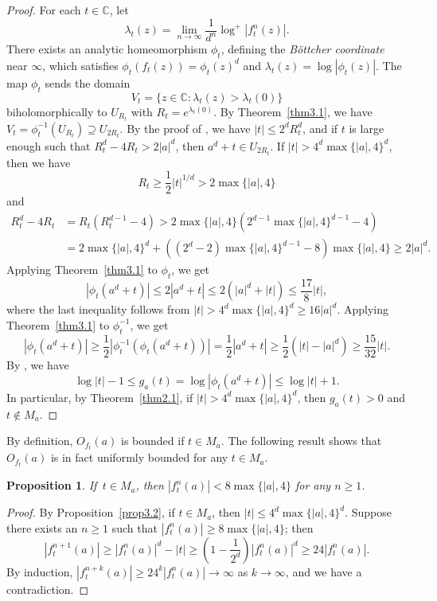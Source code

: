 \documentclass[11pt]{amsart}
\numberwithin{equation}{section}
\theoremstyle{plain}
\newtheorem{prop}[thm]{Proposition}
\theoremstyle{definition}
\theoremstyle{remark}
\newcommand{\C}{\mathbb C}
\begin{document}
\begin{proof}
For each $t\in\C$, let
\[
\lambda_{t}(z)=\lim_{n\to\infty}\frac{1}{d^{n}}\log^{+}|f_{t}^{n}(z)|.
\]
There exists an analytic homeomorphism $\phi_{t}$, defining the \textit{B\"ottcher coordinate} near $\infty$, which satisfies $\phi_{t}(f_{t}(z))=\phi_{t}(z)^{d}$ and $\lambda_{t}(z)=\log|\phi_{t}(z)|$. The map $\phi_{t}$ sends the domain
\[
V_{t}=\{z\in\C:\lambda_{t}(z)>\lambda_{t}(0)\}
\]
biholomorphically to $U_{R_{t}}$ with $R_{t}=e^{\lambda_{t}(0)}$.
By Theorem~\ref{thm3.1}, we have $V_{t}=\phi_{t}^{-1}(U_{R_{t}})\supseteq U_{2R_{t}}$.
By the proof of \cite[Lemma 3.2]{BD1}, we have $|t|\leq2^{d}R_{t}^{d}$,
and if $t$ is large enough such that $R_{t}^{d}-4R_{t}>2|a|^{d}$,
then $a^{d}+t\in U_{2R_{t}}$. If $|t|>4^{d}\max\{|a|,4\}^{d}$, then
we have
\[
R_{t}\geq\frac{1}{2}|t|^{1/d}>2\max\{|a|,4\}
\]
and
\begin{align*}
R_{t}^{d}-4R_{t} & =R_{t}\left(R_{t}^{d-1}-4\right)>2\max\{|a|,4\}\left(2^{d-1}\max\{|a|,4\}^{d-1}-4\right)\\
 & =2\max\{|a|,4\}^{d}+\left(\left(2^{d}-2\right)\max\{|a|,4\}^{d-1}-8\right)\max\{|a|,4\}\geq2|a|^{d}.
\end{align*}
Applying Theorem~\ref{thm3.1} to $\phi_{t}$, we get
\[
\left|\phi_{t}\left(a^{d}+t\right)\right|\leq2\left|a^{d}+t\right|\leq2\left(|a|^{d}+|t|\right)\leq\frac{17}{8}|t|,
\]
where the last inequality follows from $|t|>4^{d}\max\{|a|,4\}^{d}\geq16|a|^{d}$.
Applying Theorem~\ref{thm3.1} to $\phi_{t}^{-1}$, we get
\[
\left|\phi_{t}\left(a^{d}+t\right)\right|\geq\frac{1}{2}\left|\phi_{t}^{-1}\left(\phi_{t}\left(a^{d}+t\right)\right)\right|=\frac{1}{2}\left|a^{d}+t\right|\geq\frac{1}{2}\left(|t|-|a|^{d}\right)\geq\frac{15}{32}|t|.
\]
By \cite[Proposition 3.3]{BD1}, we have
\[
\log|t|-1\leq g_{a}(t)=\log\left|\phi_{t}\left(a^{d}+t\right)\right|\leq\log|t|+1.
\]
In particular, by Theorem~\ref{thm2.1}, if $|t|>4^{d}\max\{|a|,4\}^{d}$,
then $g_{a}(t)>0$ and $t\notin M_{a}$.
\end{proof}

By definition, $O_{f_{t}}(a)$ is bounded if $t\in M_{a}$. The following
result shows that $O_{f_{t}}(a)$ is in fact uniformly bounded for
any $t\in M_{a}$.

\begin{prop}\label{prop3.3}
If\, $t\in M_{a}$, then $|f_{t}^{n}(a)|<8\max\{|a|,4\}$
for any $n\geq1$.
\end{prop}

\begin{proof}
By Proposition~\ref{prop3.2}, if $t\in M_{a}$, then $|t|\leq4^{d}\max\{|a|,4\}^{d}$.
Suppose there exists an $n\geq1$ such that $|f_{t}^{n}(a)|\geq8\max\{|a|,4\}$;
then
\[
\left|f_{t}^{n+1}(a)\right|\geq\left|f_{t}^{n}(a)\right|^{d}-|t|\geq\left(1-\frac{1}{2^{d}}\right)\left|f_{t}^{n}(a)\right|^{d}\geq24\left|f_{t}^{n}(a)\right|.
\]
By induction, $|f_{t}^{n+k}(a)|\geq24^{k}|f_{t}^{n}(a)|\to\infty$
as $k\to\infty$, and we have a contradiction.
\end{proof}
\end{document}
